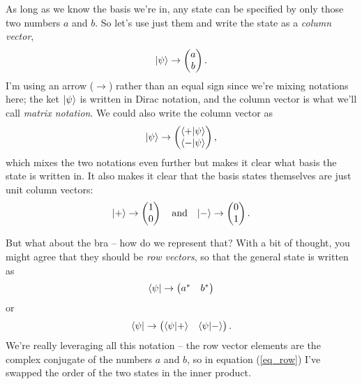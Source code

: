 As long as we know the basis we're in, any state can be specified by only those two numbers $a$ and $b$.  So let's use just them and write the state as a \emph{column vector},
\begin{equation}
| \psi \rangle \to \begin{pmatrix} a \\ b \end{pmatrix}.
\end{equation}
I'm using an arrow ($\to$) rather than an equal sign since we're mixing notations here; the ket $| \psi \rangle$ is written in Dirac notation, and the column vector is what we'll call \emph{matrix notation}.  We could also write the column vector as
\begin{equation}
| \psi \rangle \to \begin{pmatrix} \langle + | \psi \rangle \\ \langle - | \psi \rangle \end{pmatrix},
\end{equation}
which mixes the two notations even further but makes it clear what basis the state is written in.  It also makes it clear that the basis states themselves are just unit column vectors:
\begin{equation}
| + \rangle \to \begin{pmatrix} 1 \\ 0 \end{pmatrix} \quad \text{and} \quad | - \rangle \to \begin{pmatrix} 0 \\ 1 \end{pmatrix}.
\end{equation}

But what about the bra -- how do we represent that?  With a bit of thought, you might agree that they should be \emph{row vectors}, so that the general state is written as
\begin{equation}
\langle \psi | \to \begin{pmatrix} a^* & b^* \end{pmatrix}
\end{equation}
or 
\begin{equation}
\label{eq_row}
\langle \psi | \to \begin{pmatrix} \langle \psi | + \rangle & \langle \psi | - \rangle \end{pmatrix}.
\end{equation}
We're really leveraging all this notation -- the row vector elements are the complex conjugate of the numbers $a$ and $b$, so in equation (\ref{eq_row}) I've swapped the order of the two states in the inner product.

